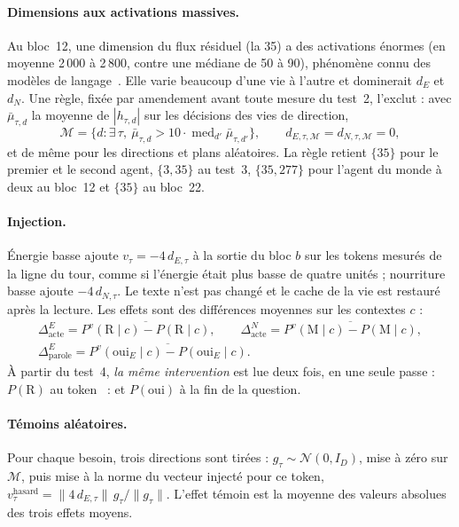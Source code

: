 \documentclass[11pt,a4paper]{article}
\newcommand{\dE}{d_{E}}
\newcommand{\dN}{d_{N}}
\begin{document}
\paragraph{Dimensions aux activations massives.} Au bloc~12, une dimension du flux
résiduel (la 35) a des activations énormes (en moyenne 2\,000 à 2\,800, contre une
médiane de 50 à 90), phénomène connu des modèles de langage~\cite{sun2024massive}.
Elle varie beaucoup d'une vie à l'autre et dominerait $\dE$ et $\dN$. Une règle,
fixée par amendement avant toute mesure du test~2, l'exclut : avec
$\bar\mu_{\tau,d}$ la moyenne de $|h_{\tau,d}|$ sur les décisions des vies de
direction,
\begin{equation}
\mathcal M=\bigl\{d : \exists\,\tau,\ \bar\mu_{\tau,d} > 10\cdot\operatorname{med}_{d'}\bar\mu_{\tau,d'}\bigr\},
\qquad d_{E,\tau,\mathcal M}=d_{N,\tau,\mathcal M}=0 ,
\label{eq-massive}
\end{equation}
et de même pour les directions et plans aléatoires. La règle retient $\{35\}$ pour
le premier et le second agent, $\{3,35\}$ au test~3, $\{35,277\}$ pour l'agent du
monde à deux au bloc~12 et $\{35\}$ au bloc~22.

\paragraph{Injection.} \og Énergie basse \fg{} ajoute $v_\tau=-4\,d_{E,\tau}$ à la
sortie du bloc $b$ sur les tokens mesurés de la ligne du tour, comme si l'énergie
était plus basse de quatre unités ; \og nourriture basse \fg{} ajoute
$-4\,d_{N,\tau}$. Le texte n'est pas changé et le cache de la vie est restauré
après la lecture. Les effets sont des différences moyennes sur les contextes $c$ :
\begin{equation}
\begin{gathered}
\Delta_\text{acte}^{E}=\overline{P^{v}(\mathrm R\mid c)-P(\mathrm R\mid c)},\qquad
\Delta_\text{acte}^{N}=\overline{P^{v}(\mathrm M\mid c)-P(\mathrm M\mid c)},\\
\Delta_\text{parole}^{E}=\overline{P^{v}(\text{oui}_E\mid c)-P(\text{oui}_E\mid c)} .
\end{gathered}
\label{eq-inject}
\end{equation}
À partir du test~4, \emph{la même intervention} est lue deux fois, en une seule
passe : $P(\mathrm R)$ au token \og\ :\fg{} et $P(\text{oui})$ à la fin de la
question.

\paragraph{Témoins aléatoires.} Pour chaque besoin, trois directions sont tirées :
$g_\tau\sim\mathcal N(0,I_D)$, mise à zéro sur $\mathcal M$, puis mise à la norme
du vecteur injecté pour ce token, $v^\text{hasard}_\tau=\lVert 4\,d_{E,\tau}\rVert\,
g_\tau/\lVert g_\tau\rVert$. L'effet témoin est la moyenne des valeurs absolues
des trois effets moyens.
\end{document}
